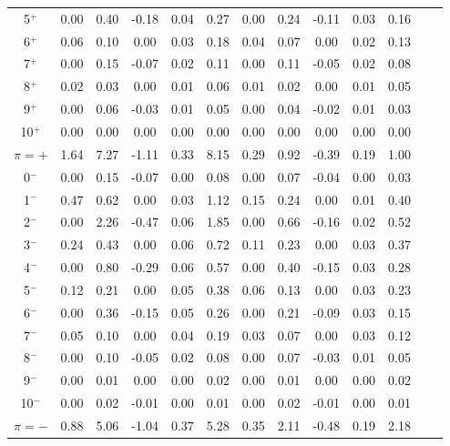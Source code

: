 \documentclass[nofootinbib,twocolumn,eqsecnum,floats,aps]{revtex4}
\begin{document}
{\begin{table*}[t]
\begin{tabular}{c|ccccc|ccccccc|}
   5$^+ $&     0.00&    0.40&   -0.18&    0.04&    0.27     &    0.00&    0.24&   -0.11&    0.03&    0.16\\
   6$^+ $&     0.06&    0.10&    0.00&    0.03&    0.18     &    0.04&    0.07&    0.00&    0.02&    0.13\\
   7$^+ $&     0.00&    0.15&   -0.07&    0.02&    0.11     &    0.00&    0.11&   -0.05&    0.02&    0.08\\
   8$^+ $&     0.02&    0.03&    0.00&    0.01&    0.06     &    0.01&    0.02&    0.00&    0.01&    0.05\\
   9$^+ $&     0.00&    0.06&   -0.03&    0.01&    0.05     &    0.00&    0.04&   -0.02&    0.01&    0.03\\
  10$^+ $&     0.00&    0.00&    0.00&    0.00&    0.00     &    0.00&    0.00&    0.00&    0.00&    0.00\\
  \hline
 $\pi=+$   &   1.64&    7.27&   -1.11&    0.33&    8.15&         0.29&    0.92&   -0.39&    0.19&    1.00\\
\hline
 \hline
   0$^- $ &    0.00&    0.15&   -0.07&    0.00&    0.08     &    0.00&    0.07&   -0.04&    0.00&    0.03\\
   1$^- $ &    0.47&    0.62&    0.00&    0.03&    1.12     &    0.15&    0.24&    0.00&    0.01&    0.40\\
   2$^- $ &    0.00&    2.26&   -0.47&    0.06&    1.85     &    0.00&    0.66&   -0.16&    0.02&    0.52\\
   3$^- $ &    0.24&    0.43&    0.00&    0.06&    0.72     &    0.11&    0.23&    0.00&    0.03&    0.37\\
   4$^- $ &    0.00&    0.80&   -0.29&    0.06&    0.57     &    0.00&    0.40&   -0.15&    0.03&    0.28\\
   5$^- $ &    0.12&    0.21&    0.00&    0.05&    0.38     &    0.06&    0.13&    0.00&    0.03&    0.23\\
   6$^- $ &    0.00&    0.36&   -0.15&    0.05&    0.26     &    0.00&    0.21&   -0.09&    0.03&    0.15\\
   7$^- $ &    0.05&    0.10&    0.00&    0.04&    0.19     &    0.03&    0.07&    0.00&    0.03&    0.12\\
   8$^- $ &    0.00&    0.10&   -0.05&    0.02&    0.08     &    0.00&    0.07&   -0.03&    0.01&    0.05\\
   9$^- $ &    0.00&    0.01&    0.00&    0.00&    0.02     &    0.00&    0.01&    0.00&    0.00&    0.02\\
  10$^- $ &    0.00&    0.02&   -0.01&    0.00&    0.01     &    0.00&    0.02&   -0.01&    0.00&    0.01\\
 \hline
 $\pi=-$   &   0.88&    5.06&   -1.04&    0.37&    5.28     &    0.35&    2.11&   -0.48&    0.19&    2.18\\
\hline\hline
\end{tabular}
\end{table*}

}
\end{document}
